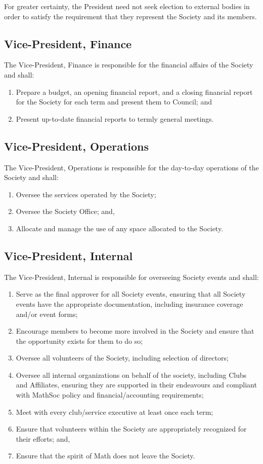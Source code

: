 For greater certainty, the President need not seek election to external bodies
in order to satisfy the requirement that they represent the Society and its
members.

\subsection{Vice-President, Finance}
The Vice-President, Finance is responsible for the financial affairs of the
Society and shall:
\begin{enumerate}
  \item Prepare a budget, an opening financial report, and a closing financial
    report for the Society for each term and present them to Council; and
  \item Present up-to-date financial reports to termly general meetings.
\end{enumerate}

\subsection{Vice-President, Operations}
The Vice-President, Operations is responsible for the day-to-day operations of
the Society and shall:
\begin{enumerate}
  \item Oversee the services operated by the Society;
  \item Oversee the Society Office; and,
  \item Allocate and manage the use of any space allocated to the Society.
\end{enumerate}

\subsection{Vice-President, Internal}
The Vice-President, Internal is responsible for overseeing Society events and
shall:
\begin{enumerate}
  \item Serve as the final approver for all Society events, ensuring that all
      Society events have the appropriate documentation, including insurance
      coverage and/or event forms;
  \item Encourage members to become more involved in the Society and ensure
      that the opportunity exists for them to do so;
  \item Oversee all volunteers of the Society, including selection of
      directors;
  \item Oversee all internal organizations on behalf of the society, including
      Clubs and Affiliates, ensuring they are supported in their endeavours and
      compliant with MathSoc policy and financial/accounting requirements;
  \item Meet with every club/service executive at least once each term;
  \item Ensure that volunteers within the Society are appropriately recognized
      for their efforts; and,
  \item Ensure that the spirit of Math does not leave the Society.
\end{enumerate}

